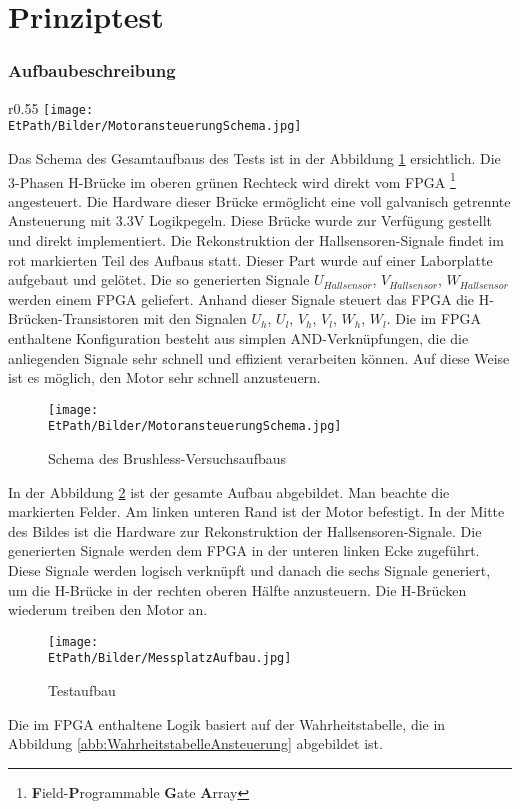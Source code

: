 \ifSTANDALONE
\section{Prinziptest}
\fi
\ifEMBED
\subsubsection{Aufbaubeschreibung}
    \BLDCcollab
\fi
\ifEMBED
    \begin{wrapfigure}{r}{0.55\textwidth}
       	\texttt{[image: \\EtPath/Bilder/MotoransteuerungSchema.jpg]}
       	\centering
       	\caption{Schema des Brushless-Versuchsaufbaus}
        \label{abb:MotoransteuerungSchema}
    \end{wrapfigure}
\fi
    Das Schema des Gesamtaufbaus des Tests ist in der Abbildung 
    \ref{abb:MotoransteuerungSchema} ersichtlich. Die 3-Phasen H-Brücke 
    im oberen grünen Rechteck wird direkt vom FPGA \footnote{\textbf{F}ield-\textbf{P}rogrammable \textbf{G}ate \textbf{A}rray} angesteuert. Die Hardware 
    dieser Brücke ermöglicht eine voll galvanisch getrennte Ansteuerung 
    mit 3.3V Logikpegeln. Diese Brücke wurde zur Verfügung gestellt und direkt
    implementiert. Die Rekonstruktion der Hallsensoren-Signale findet im rot 
    markierten Teil des Aufbaus statt. Dieser Part wurde auf einer 
    Laborplatte aufgebaut und gelötet. Die so generierten Signale 
    $U_{Hallsensor}$, $V_{Hallsensor}$, $W_{Hallsensor}$ werden einem FPGA 
    geliefert. Anhand dieser Signale steuert das FPGA die 
    H-Brücken-Transistoren mit den Signalen $U_h$, $U_l$, $V_h$, $V_l$, 
    $W_h$, $W_l$. Die im FPGA enthaltene Konfiguration besteht aus simplen 
    AND-Verknüpfungen, die die anliegenden Signale sehr schnell und 
    effizient verarbeiten können. Auf diese Weise ist es möglich, den Motor sehr 
    schnell anzusteuern.
    \ifSTANDALONE
    \begin{figure}[h!]
    	\texttt{[image: \\EtPath/Bilder/MotoransteuerungSchema.jpg]}
       	\centering
       	\caption{Schema des Brushless-Versuchsaufbaus}
        \label{abb:MotoransteuerungSchema}
    \end{figure}
    \fi
    In der Abbildung \ref{abb:MessplatzAufbau} ist der gesamte Aufbau 
    abgebildet. Man beachte die markierten Felder. Am linken unteren Rand 
    ist der Motor befestigt. In der Mitte des Bildes ist die Hardware zur Rekonstruktion der Hallsensoren-Signale.
    Die generierten Signale werden dem FPGA in der unteren linken Ecke zugeführt. Diese 
    Signale werden logisch verknüpft und danach die sechs Signale 
    generiert, um die H-Brücke in der rechten oberen Hälfte anzusteuern. 
    Die H-Brücken wiederum treiben den Motor an.
    \begin{figure}[h!]
       	\texttt{[image: \\EtPath/Bilder/MessplatzAufbau.jpg]}
       	\centering
       	\caption{Testaufbau} 
        \label{abb:MessplatzAufbau}
    \end{figure}
    Die im FPGA enthaltene Logik basiert auf der Wahrheitstabelle, die in 
    Abbildung \ref{abb:WahrheitstabelleAnsteuerung} abgebildet ist.

